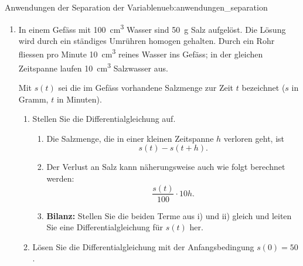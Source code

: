 \begin{ueb}{Anwendungen der Separation der Variablen}{ueb:anwendungen_separation}

    \begin{enumerate}
        \item In einem Gefäss mit \qty{100}{\centi\meter\cubed}
              Wasser sind \qty{50}{\gram} Salz aufgelöst.
              Die Lösung wird durch ein ständiges Umrühren
              homogen gehalten. Durch ein Rohr fliessen pro
              Minute \qty{10}{\centi\meter\cubed} reines Wasser
              ins Gefäss; in der gleichen Zeitspanne laufen
              \qty{10}{\centi\meter\cubed} Salzwasser aus.

              Mit \(s(t)\) sei die im Gefäss vorhandene
              Salzmenge zur Zeit \(t\) bezeichnet
              (\(s\) in Gramm, \(t\) in Minuten).

              \begin{enumerate}[label=\alph*)]
                  \item Stellen Sie die Differentialgleichung auf.

                        \begin{enumerate}[label=\roman*)]
                            \item Die Salzmenge, die in einer kleinen
                                  Zeitspanne \(h\) verloren geht, ist
                                  \[
                                      s(t)-s(t+h).
                                  \]

                            \item Der Verlust an Salz kann
                                  näherungsweise auch wie folgt
                                  berechnet werden:
                                  \[
                                      \frac{s(t)}{100}\cdot 10h.
                                  \]

                            \item \textbf{Bilanz:}
                                  Stellen Sie die beiden Terme aus
                                  i) und ii) gleich und leiten Sie
                                  eine Differentialgleichung für
                                  \(s(t)\) her.
                        \end{enumerate}

                  \item Lösen Sie die Differentialgleichung
                        mit der Anfangsbedingung \(s(0)=50\).


\end{enumerate}
\end{enumerate}
\end{ueb}
